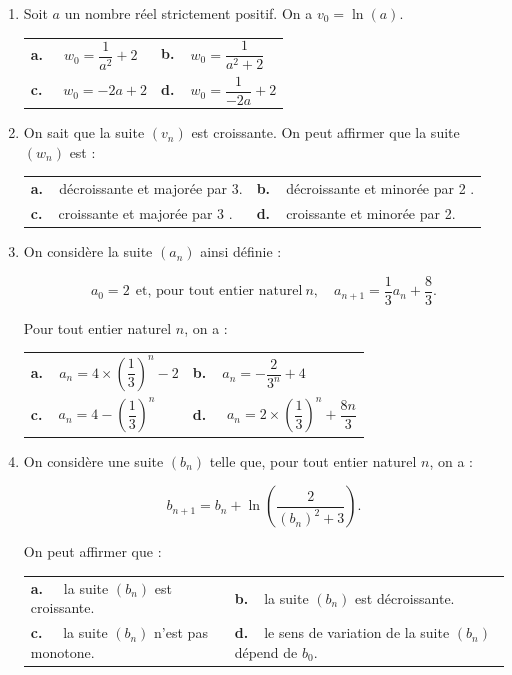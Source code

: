 \begin{enumerate}[resume]
\item  Soit $a$ un nombre réel strictement positif. On a $v_0 = \ln (a)$.

\begin{center}
\begin{tabularx}{\linewidth}{X X}
\textbf{a.~~} $w_0 = \dfrac{1}{a^2}  +2$&\textbf{b.~~}$w_0 = \dfrac{1}{a^2  +2}$\\
\textbf{c.~~} $w_0 = -2a +2$&\textbf{d.~~}$w_0 = \dfrac{1}{- 2a} + 2$
\end{tabularx}
\end{center}

\item On sait que la suite $\left(v_n\right)$ est croissante. On peut affirmer que la suite $\left(w_n\right)$ est :

\begin{center}
\begin{tabularx}{\linewidth}{X X}
\textbf{a.~~}décroissante et majorée par 3.&\textbf{b.~~}décroissante et minorée par 2 .\\
\textbf{c.~~}croissante et majorée par 3 .&\textbf{d.~~}croissante et minorée par 2.
\end{tabularx}
\end{center}

\item On considère la suite $\left(a_n\right)$ ainsi définie :

\[a_0 = 2 \:\:\text{et, pour tout entier naturel}\: n, \quad a_{n+1} = \dfrac13a_n + \dfrac83.\]


Pour tout entier naturel $n$, on a :
\begin{center}
\begin{tabularx}{\linewidth}{X X}
\textbf{a.~~}$a_n = 4 \times \left(\dfrac13\right)^n - 2$&\textbf{b.~~}$a_n = - \dfrac{2}{3^n} + 4$\\
\textbf{c.~~}$a_n = 4 - \left(\dfrac13\right)^n$ & \textbf{d.~~} $a_n = 2 \times \left(\dfrac13\right)^n + \dfrac{8n}{3}$
\end{tabularx}
\end{center}
\item On considère une suite $\left(b_n\right)$ telle que, pour tout entier naturel $n$, on a :

\[b_{n+1} = b_n + \ln \left(\dfrac{2}{\left(b_n \right)^2 + 3}\right).\]

On peut affirmer que :

\begin{center}
\begin{tabularx}{\linewidth}{X X}
\textbf{a.~~} la suite $\left(b_n\right)$ est croissante.&\textbf{b.~~}la suite $\left(b_n\right)$ est décroissante.\\
\textbf{c.~~} la suite $\left(b_n\right)$ n'est pas monotone.&\textbf{d.~~}le sens de variation de la suite $\left(b_n\right)$ dépend de $b_0$.
\end{tabularx}
\end{center}


\end{enumerate}
